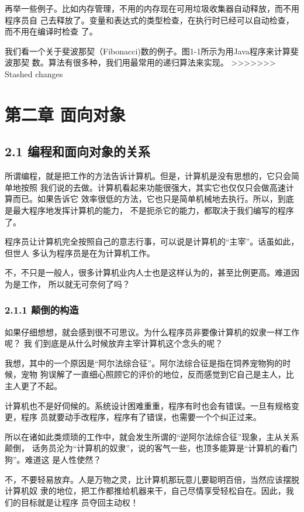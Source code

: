 \documentclass[11pt]{ctexart}
\begin{document}
再举一些例子。比如内存管理，不用的内存现在可用垃圾收集器自动释放，而不用程序员自
己去释放了。变量和表达式的类型检查，在执行时已经可以自动检查，而不用在编译时检查
了。

我们看一个关于斐波那契（Fibonacci)数的例子。图1-1所示为用Java程序来计算斐波那契
数。算法有很多种，我们用最常用的递归算法来实现。
>>>>>>> Stashed changes

\section{第二章 面向对象}
\label{sec:orge8390ed}

\subsection{2.1 编程和面向对象的关系}
\label{sec:org253546d}

所谓编程，就是把工作的方法告诉计算机。但是，计算机是没有思想的，它只会简单地按照
我们说的去做。计算机看起来功能很强大，其实它也仅仅只会做高速计算而已。如果告诉它
效率很低的方法，它也只是简单机械地去执行。所以，到底是最大程序地发挥计算机的能力，
不是扼杀它的能力，都取决于我们编写的程序了。

程序员让计算机完全按照自己的意志行事，可以说是计算机的“主宰”。话虽如此，但世人
多认为程序员是在为计算机工作。

不，不只是一般人，很多计算机业内人士也是这样认为的，甚至比例更高。难道因为是工作，
所以就无可奈何了吗？

\subsubsection{2.1.1 颠倒的构造}
\label{sec:orgda6e1a1}

如果仔细想想，就会感到很不可思议。为什么程序员非要像计算机的奴隶一样工作呢？ 我
们到底是从什么时候放弃主宰计算机这个念头的呢？

我想，其中的一个原因是“阿尔法综合征”。阿尔法综合征是指在饲养宠物狗的时候，宠物
狗误解了一直细心照顾它的评价的地位，反而感觉到它自己是主人，比主人更了不起。

计算机也不是好伺候的。系统设计困难重重，程序有时也会有错误。一旦有规格变更，程序
员就要动手改程序，程序有了错误，也需要一个个纠正过来。

所以在诸如此类烦琐的工作中，就会发生所谓的“逆阿尔法综合征”现象，主从关系颠倒，
话务员沦为“计算机的奴隶”，说的客气一些，也顶多能算是“计算机的看门狗”。难道这
是人性使然？

不，不要轻易放弃。人是万物之灵，比计算机那玩意儿要聪明百倍，当然应该摆脱计算机奴
隶的地位，把工作都推给机器来干，自己尽情享受轻松自在。因此，我们的目标就是让程序
员夺回主动权！
\end{document}
